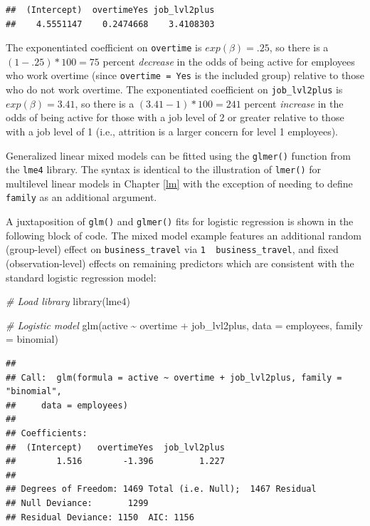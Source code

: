 \documentclass[
]{book}
\newenvironment{Shaded}{\begin{snugshade}}{\end{snugshade}}
\newcommand{\AttributeTok}[1]{\textcolor[rgb]{0.77,0.63,0.00}{#1}}
\newcommand{\CommentTok}[1]{\textcolor[rgb]{0.56,0.35,0.01}{\textit{#1}}}
\newcommand{\FunctionTok}[1]{\textcolor[rgb]{0.00,0.00,0.00}{#1}}
\newcommand{\NormalTok}[1]{#1}
\newcommand{\SpecialCharTok}[1]{\textcolor[rgb]{0.00,0.00,0.00}{#1}}
\newcommand{\StringTok}[1]{\textcolor[rgb]{0.31,0.60,0.02}{#1}}
\begin{document}
\begin{verbatim}
##  (Intercept)  overtimeYes job_lvl2plus 
##    4.5551147    0.2474668    3.4108303
\end{verbatim}

The exponentiated coefficient on \texttt{overtime} is \(exp(\beta) = .25\), so there is a \((1 - .25) * 100 = 75%
\) percent \emph{decrease} in the odds of being active for employees who work overtime (since \texttt{overtime\ =\ Yes} is the included group) relative to those who do not work overtime. The exponentiated coefficient on \texttt{job\_lvl2plus} is \(exp(\beta) = 3.41\), so there is a \((3.41 - 1) * 100 = 241%
\) percent \emph{increase} in the odds of being active for those with a job level of 2 or greater relative to those with a job level of 1 (i.e., attrition is a larger concern for level 1 employees).

Generalized linear mixed models can be fitted using the \texttt{glmer()} function from the \texttt{lme4} library. The syntax is identical to the illustration of \texttt{lmer()} for multilevel linear models in Chapter \ref{lm} with the exception of needing to define \texttt{family} as an additional argument.

A juxtaposition of \texttt{glm()} and \texttt{glmer()} fits for logistic regression is shown in the following block of code. The mixed model example features an additional random (group-level) effect on \texttt{business\_travel} via \texttt{1\ \textbar{}\ business\_travel}, and fixed (observation-level) effects on remaining predictors which are consistent with the standard logistic regression model:

\begin{Shaded}
\begin{Highlighting}[]
\CommentTok{\# Load library}
\FunctionTok{library}\NormalTok{(lme4)}

\CommentTok{\# Logistic model}
\FunctionTok{glm}\NormalTok{(active }\SpecialCharTok{\textasciitilde{}}\NormalTok{ overtime }\SpecialCharTok{+}\NormalTok{ job\_lvl2plus, }\AttributeTok{data =}\NormalTok{ employees, }\AttributeTok{family =} \StringTok{\textquotesingle{}binomial\textquotesingle{}}\NormalTok{)}
\end{Highlighting}
\end{Shaded}

\begin{verbatim}
## 
## Call:  glm(formula = active ~ overtime + job_lvl2plus, family = "binomial", 
##     data = employees)
## 
## Coefficients:
##  (Intercept)   overtimeYes  job_lvl2plus  
##        1.516        -1.396         1.227  
## 
## Degrees of Freedom: 1469 Total (i.e. Null);  1467 Residual
## Null Deviance:       1299 
## Residual Deviance: 1150  AIC: 1156
\end{verbatim}
\end{document}
